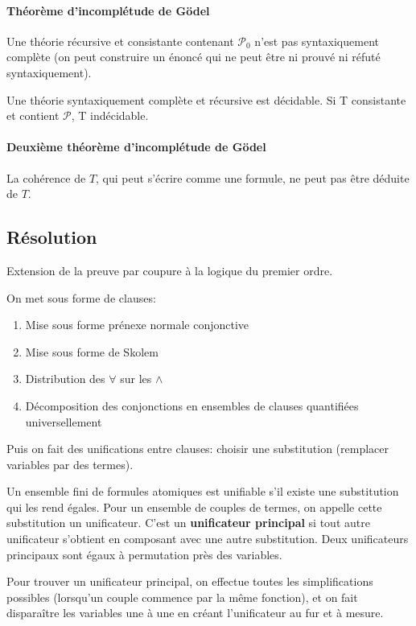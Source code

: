 \documentclass[french]{article}
\begin{document}
\paragraph{Théorème d'incomplétude de Gödel} Une théorie récursive et consistante contenant $\mathcal{P}_0$ n'est pas syntaxiquement complète (on peut construire un énoncé qui ne peut être ni prouvé ni réfuté syntaxiquement).

Une théorie syntaxiquement complète et récursive est décidable. Si T consistante et contient $\mathcal{P}$, T indécidable.

\paragraph{Deuxième théorème d'incomplétude de Gödel}
La cohérence de $T$, qui peut s'écrire comme une formule, ne peut pas être déduite de $T$.

\subsection{Résolution}
Extension de la preuve par coupure à la logique du premier ordre.

On met sous forme de clauses:
\begin{enumerate}
\item Mise sous forme prénexe normale conjonctive
\item Mise sous forme de Skolem
\item Distribution des $\forall$ sur les $\wedge$
\item Décomposition des conjonctions en ensembles de clauses quantifiées universellement
\end{enumerate}

Puis on fait des unifications entre clauses:
choisir une substitution (remplacer variables par des termes).

Un ensemble fini de formules atomiques est unifiable s'il existe une substitution qui les rend égales. Pour un ensemble de couples de termes, on appelle cette substitution un unificateur. C'est un \textbf{unificateur principal} si tout autre unificateur s'obtient en composant avec une autre substitution. Deux unificateurs principaux sont égaux à permutation près des variables.

Pour trouver un unificateur principal, on effectue toutes les simplifications possibles (lorsqu'un couple commence par la même fonction), et on fait disparaître les variables une à une en créant l'unificateur au fur et à mesure.
\end{document}
